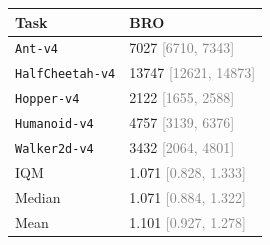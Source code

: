 \begin{tabular}{ll}
\toprule
Task & BRO \\
\midrule
\texttt{Ant-v4} & 7027 \textcolor{gray}{[6710, 7343]} \\
\texttt{HalfCheetah-v4} & 13747 \textcolor{gray}{[12621, 14873]} \\
\texttt{Hopper-v4} & 2122 \textcolor{gray}{[1655, 2588]} \\
\texttt{Humanoid-v4} & 4757 \textcolor{gray}{[3139, 6376]} \\
\texttt{Walker2d-v4} & 3432 \textcolor{gray}{[2064, 4801]} \\
IQM & 1.071 \textcolor{gray}{[0.828, 1.333]} \\
Median & 1.071 \textcolor{gray}{[0.884, 1.322]} \\
Mean & 1.101 \textcolor{gray}{[0.927, 1.278]} \\
\bottomrule
\end{tabular}
